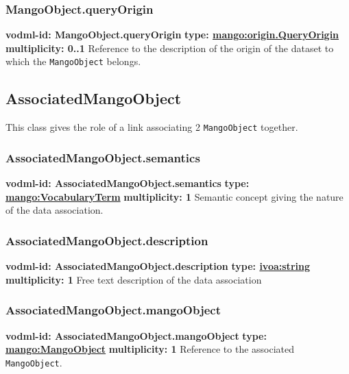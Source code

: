     \subsubsection{MangoObject.queryOrigin}
    \textbf{vodml-id: MangoObject.queryOrigin} \newline
    \textbf{type: \hyperref[sect:origin.QueryOrigin]{mango:origin.QueryOrigin}} \newline
    \textbf{multiplicity: 0..1} \newline
    Reference to the description of the origin of the dataset to which the \texttt{MangoObject} belongs.

  \subsection{AssociatedMangoObject}
    \label{sect:AssociatedMangoObject}
    This class gives the role of a link associating 2 \texttt{MangoObject} together.

    \subsubsection{AssociatedMangoObject.semantics}
    \textbf{vodml-id: AssociatedMangoObject.semantics} \newline
    \textbf{type: \hyperref[sect:VocabularyTerm]{mango:VocabularyTerm}} \newline
    \textbf{multiplicity: 1} \newline
    Semantic concept giving the nature of the data association.

    \subsubsection{AssociatedMangoObject.description}
    \textbf{vodml-id: AssociatedMangoObject.description} \newline
    \textbf{type: \hyperref[sect:ivoa]{ivoa:string}} \newline
    \textbf{multiplicity: 1} \newline
    Free text description of the data association

    \subsubsection{AssociatedMangoObject.mangoObject}
    \textbf{vodml-id: AssociatedMangoObject.mangoObject} \newline
    \textbf{type: \hyperref[sect:MangoObject]{mango:MangoObject}} \newline
    \textbf{multiplicity: 1} \newline
    Reference to the associated \texttt{MangoObject}.

